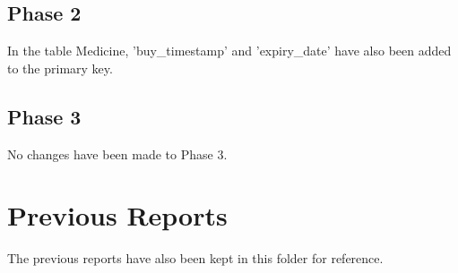 \documentclass[a4paper]{article}
\begin{document}
	\subsection{Phase 2}
		In the table Medicine, 'buy\_timestamp' and 'expiry\_date' have also been added to the primary key.
	\subsection{Phase 3}
		No changes have been made to Phase 3.
		
\section{Previous Reports}
	The previous reports have also been kept in this folder for reference.
\end{document}
